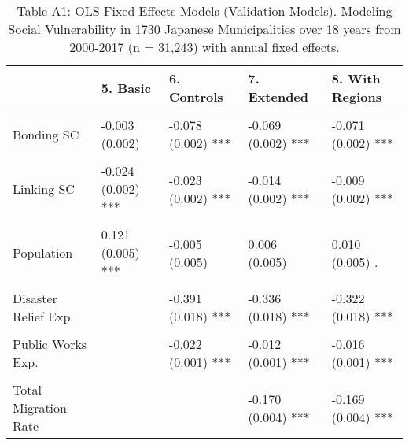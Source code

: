 \documentclass[]{elsarticle} %
\begin{document}
\begin{table}

\caption{Table A1: OLS Fixed Effects Models (Validation Models). Modeling Social Vulnerability in 1730 Japanese Municipalities over 18 years from 2000-2017 (n = 31,243) with annual fixed effects.}
\begin{threeparttable}
\begin{tabular}[t]{lllll}
\toprule
 & 5. Basic & 6. Controls & 7. Extended & 8. With Regions\\
\midrule
\textbf{\cellcolor{gray!6}{Direct Effects}} & \textbf{\cellcolor{gray!6}{}} & \textbf{\cellcolor{gray!6}{}} & \textbf{\cellcolor{gray!6}{}} & \textbf{\cellcolor{gray!6}{}}\\
Bonding SC & -0.003 (0.002) & -0.078 (0.002) *** & -0.069 (0.002) *** & -0.071 (0.002) ***\\
\cellcolor{gray!6}{Bridging SC} & \cellcolor{gray!6}{0.009 (0.001) ***} & \cellcolor{gray!6}{0.043 (0.001) ***} & \cellcolor{gray!6}{0.032 (0.001) ***} & \cellcolor{gray!6}{0.023 (0.001) ***}\\
Linking SC & -0.024 (0.002) *** & -0.023 (0.002) *** & -0.014 (0.002) *** & -0.009 (0.002) ***\\
\textbf{\cellcolor{gray!6}{Controls}} & \textbf{\cellcolor{gray!6}{}} & \textbf{\cellcolor{gray!6}{}} & \textbf{\cellcolor{gray!6}{}} & \textbf{\cellcolor{gray!6}{}}\\
\addlinespace
Population & 0.121 (0.005) *** & -0.005 (0.005) & 0.006 (0.005) & 0.010 (0.005) .\\
\cellcolor{gray!6}{Financial Strength} & \cellcolor{gray!6}{} & \cellcolor{gray!6}{0.084 (0.002) ***} & \cellcolor{gray!6}{0.090 (0.002) ***} & \cellcolor{gray!6}{0.089 (0.003) ***}\\
Disaster Relief Exp. &  & -0.391 (0.018) *** & -0.336 (0.018) *** & -0.322 (0.018) ***\\
\textbf{\cellcolor{gray!6}{Emergency Services Exp.}} & \textbf{\cellcolor{gray!6}{}} & \textbf{\cellcolor{gray!6}{-0.040 (0.001) ***}} & \textbf{\cellcolor{gray!6}{-0.044 (0.001) ***}} & \textbf{\cellcolor{gray!6}{-0.043 (0.001) ***}}\\
Public Works Exp. &  & -0.022 (0.001) *** & -0.012 (0.001) *** & -0.016 (0.001) ***\\
\addlinespace
\cellcolor{gray!6}{Disaster Conditions} & \cellcolor{gray!6}{} & \cellcolor{gray!6}{} & \cellcolor{gray!6}{0.038 (0.008) ***} & \cellcolor{gray!6}{0.047 (0.008) ***}\\
Total Migration Rate &  &  & -0.170 (0.004) *** & -0.169 (0.004) ***\\

\end{tabular}
\end{threeparttable}
\end{table}
\end{document}

